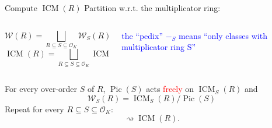 \documentclass[usenames,dvipsnames]{beamer}
\def\Q{\mathbb{Q}}
\DeclareMathOperator{\ICM}{ICM}
\DeclareMathOperator{\Pic}{Pic}
\newcommand{\cO}{{\mathcal O}}
\newcommand{\cW}{{\mathcal W}}
\newcommand{\red}[1]{\textcolor{red}{#1}}
\begin{document}
\begin{frame}{ Compute $\ICM(R)$ }
\pause Partition w.r.t. the multiplicator ring:
    \begin{columns}
    \begin{column}{0.5\textwidth}
      \[ \cW(R) = \bigsqcup_{R\subseteq S \subseteq \cO_K} \cW_S(R)\]
      \[ \ICM(R) = \bigsqcup_{R\subseteq S \subseteq \cO_K} \ICM_S(R)\]
    \end{column}
\pause
    \begin{column}{0.5\textwidth}  %
	\begin{center}
	\textcolor{blue}{\parbox{10em}{the ``pedix'' $-_S$ means ``only classes with multiplicator ring S''}} 
	\end{center}
    \end{column}
    \end{columns}
\pause
   \begin{theorem}[M.]
    For every over-order $S$ of $R$, $\Pic(S)$ acts \red{freely} on $\ICM_S(R)$ and
    \[ \cW_S(R) = \ICM_S(R) / \Pic(S) \]
\pause Repeat for every $R\subseteq S \subseteq \cO_K$:
    \[ \rightsquigarrow \ICM(R).\]
   \end{theorem}
\end{frame}

% 
\end{document}
